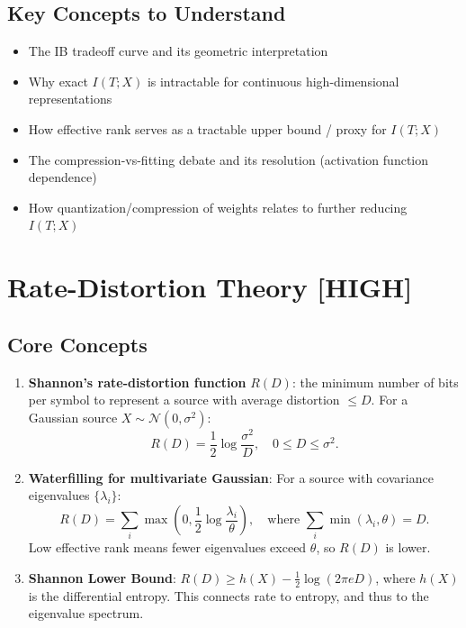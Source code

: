 \documentclass[11pt,a4paper]{article}
\begin{document}
\subsection{Key Concepts to Understand}
\begin{itemize}
    \item The IB tradeoff curve and its geometric interpretation
    \item Why exact $I(T;X)$ is intractable for continuous high-dimensional representations
    \item How effective rank serves as a tractable upper bound / proxy for $I(T;X)$
    \item The compression-vs-fitting debate and its resolution (activation function dependence)
    \item How quantization/compression of weights relates to further reducing $I(T;X)$
\end{itemize}

\section{Rate-Distortion Theory \textnormal{\textcolor{red!70!black}{[HIGH]}}}

\subsection{Core Concepts}

\begin{enumerate}
    \item \textbf{Shannon's rate-distortion function} $R(D)$: the minimum number of bits per symbol to represent a source with average distortion $\leq D$. For a Gaussian source $X \sim \mathcal{N}(0, \sigma^2)$:
    \begin{equation}
        R(D) = \frac{1}{2}\log\frac{\sigma^2}{D}, \quad 0 \leq D \leq \sigma^2.
    \end{equation}

    \item \textbf{Waterfilling for multivariate Gaussian}: For a source with covariance eigenvalues $\{\lambda_i\}$:
    \begin{equation}
        R(D) = \sum_i \max\!\left(0, \frac{1}{2}\log\frac{\lambda_i}{\theta}\right), \quad \text{where } \sum_i \min(\lambda_i, \theta) = D.
    \end{equation}
    Low effective rank means fewer eigenvalues exceed $\theta$, so $R(D)$ is lower.

    \item \textbf{Shannon Lower Bound}: $R(D) \geq h(X) - \frac{1}{2}\log(2\pi e D)$, where $h(X)$ is the differential entropy. This connects rate to entropy, and thus to the eigenvalue spectrum.
\end{enumerate}
\end{document}
